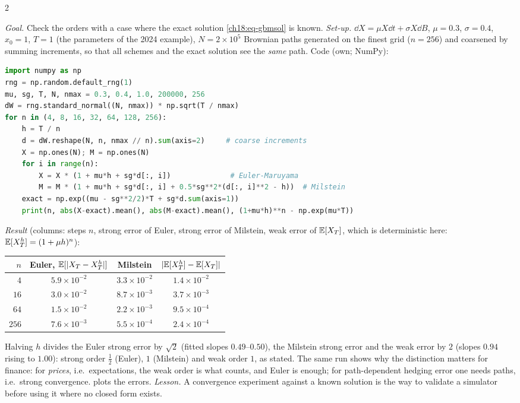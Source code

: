 \begin{paracol}{2}
\begin{casestudy}\label{ch18:cs-em}
\emph{Goal.} Check the orders with a case where the exact solution \eqref{ch18:eq-gbmsol} is known. \emph{Set-up.} $\dd X=\mu X\dd t+\sigma X\dd B$, $\mu=0.3$, $\sigma=0.4$, $x_0=1$, $T=1$ (the parameters of the 2024 example), $N=2\times10^5$ Brownian paths generated on the finest grid ($n=256$) and coarsened by summing increments, so that all schemes and the exact solution see the \emph{same} path. Code (own; NumPy):
\begin{lstlisting}[language=Python]
import numpy as np
rng = np.random.default_rng(1)
mu, sg, T, N, nmax = 0.3, 0.4, 1.0, 200000, 256
dW = rng.standard_normal((N, nmax)) * np.sqrt(T / nmax)
for n in (4, 8, 16, 32, 64, 128, 256):
    h = T / n
    d = dW.reshape(N, n, nmax // n).sum(axis=2)     # coarse increments
    X = np.ones(N); M = np.ones(N)
    for i in range(n):
        X = X * (1 + mu*h + sg*d[:, i])              # Euler-Maruyama
        M = M * (1 + mu*h + sg*d[:, i] + 0.5*sg**2*(d[:, i]**2 - h))  # Milstein
    exact = np.exp((mu - sg**2/2)*T + sg*d.sum(axis=1))
    print(n, abs(X-exact).mean(), abs(M-exact).mean(), (1+mu*h)**n - np.exp(mu*T))
\end{lstlisting}
\emph{Result} (columns: steps $n$, strong error of Euler, strong error of Milstein, weak error of $\mathbb{E}[X_T]$, which is deterministic here: $\mathbb{E}[X^h_T]=(1+\mu h)^n$):
\begin{center}
\small
\begin{tabular}{@{}rccc@{}}
\toprule
$n$ & Euler, $\mathbb{E}[|X_T-X_T^h|]$ & Milstein & $|\mathbb{E}[X_T^h]-\mathbb{E}[X_T]|$\\
\midrule
$4$ & $5.9\times10^{-2}$ & $3.3\times10^{-2}$ & $1.4\times10^{-2}$\\
$16$ & $3.0\times10^{-2}$ & $8.7\times10^{-3}$ & $3.7\times10^{-3}$\\
$64$ & $1.5\times10^{-2}$ & $2.2\times10^{-3}$ & $9.5\times10^{-4}$\\
$256$ & $7.6\times10^{-3}$ & $5.5\times10^{-4}$ & $2.4\times10^{-4}$\\
\bottomrule
\end{tabular}
\end{center}
Halving $h$ divides the Euler strong error by $\sqrt2$ (fitted slopes $0.49$--$0.50$), the Milstein strong error and the weak error by $2$ (slopes $0.94$ rising to $1.00$): strong order $\tfrac12$ (Euler), $1$ (Milstein) and weak order $1$, as stated. The same run shows why the distinction matters for finance: for \emph{prices}, i.e.\ expectations, the weak order is what counts, and Euler is enough; for path-dependent hedging error one needs paths, i.e.\ strong convergence.  plots the errors. \emph{Lesson.} A convergence experiment against a known solution is the way to validate a simulator before using it where no closed form exists.

\end{casestudy}
\end{paracol}
